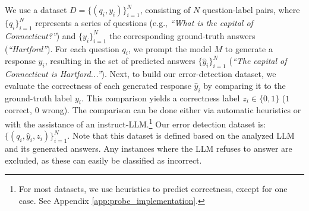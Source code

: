 \documentclass{article} %
\begin{document}
We use a dataset $D=\{(q_i,y_i)\}_{i=1}^N$, consisting of $N$ question-label pairs, where $\{q_i\}_{i=1}^N$ represents a series of questions (e.g., \textit{``What is the capital of Connecticut?''}) and $\{y_i\}_{i=1}^N$ the corresponding ground-truth answers (\textit{``Hartford''}).
For each question $q_i$, we prompt the model $M$ to generate a response $y_i$, resulting in the set of predicted answers $\{\hat{y}_i\}_{i=1}^N$ (\textit{``The capital of Connecticut is Hartford...''}).
Next, to build our error-detection dataset, we evaluate the correctness of each generated response $\hat{y}_i$ by comparing it to the ground-truth label $y_i$.
This comparison yields a correctness label $z_i \in \{0,1\}$ ($1$ correct, $0$ wrong).
The comparison can be done either via automatic heuristics or with the assistance of an instruct-LLM.\footnote{For most datasets, we use heuristics to predict correctness, except for one case. See Appendix \ref{app:probe_implementation}.}
Our error detection dataset is: $\{(q_i,\hat{y}_i,z_i)\}_{i=1}^N$.
Note that this dataset is defined based on the analyzed LLM and its generated answers.
Any instances where the LLM refuses to answer are excluded, as these can easily be classified as incorrect.


\end{document}
